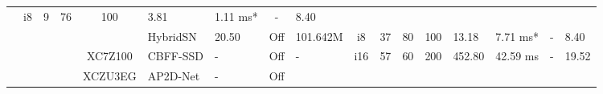 \begin{table}
\begin{adjustbox}{totalheight=\baselineskip,}
\begin{tabular}{ccccclp{2em}cp{3em}cp{2em}p{4em}p{3em}p{3.5em}p{3.5em}p{2.5em}p{3em}}
                                   &\multirow{1}{*}{i8}
                                       &\multirow{1}{*}{9}
                                           &\multirow{1}{*}{76}
                                               &\multirow{1}{*}{100}
                                                   &\multirow{1}{*}{3.81}
                                                       &\multirow{1}{*}{1.11 ms*}
                                                           &\multirow{1}{*}{-}
                                                               &\multirow{1}{*}{8.40}\\
   &   &   &   &   &\multirow{1}{*}{HybridSN}
                       &\multirow{1}{*}{20.50}
                           &\multirow{1}{*}{Off}
                               &\multirow{1}{*}{101.642M}
                                   &\multirow{1}{*}{i8}
                                       &\multirow{1}{*}{37}
                                           &\multirow{1}{*}{80}
                                               &\multirow{1}{*}{100}
                                                   &\multirow{1}{*}{13.18}
                                                       &\multirow{1}{*}{7.71 ms*}
                                                           &\multirow{1}{*}{-}
                                                               &\multirow{1}{*}{8.40}\\
\cmidrule{4-17}
   &   &   &\multirow{1}{*}{\cite{liEfficientObjectDetection2019a}}
               &\multirow{1}{*}{XC7Z100}
                   &\multirow{1}{*}{CBFF-SSD}
                       &\multirow{1}{*}{-}
                           &\multirow{1}{*}{Off}
                               &\multirow{1}{*}{-}
                                   &\multirow{1}{*}{i16}
                                       &\multirow{1}{*}{57}
                                           &\multirow{1}{*}{60}
                                               &\multirow{1}{*}{200}
                                                   &\multirow{1}{*}{452.80}
                                                       &\multirow{1}{*}{42.59 ms}
                                                           &\multirow{1}{*}{-}
                                                               &\multirow{1}{*}{19.52}\\
\cmidrule{4-17}
   &   &   &\multirow{1}{*}{\cite{liNovelCNNBasedAP2DNet2020}}
               &\multirow{1}{*}{XCZU3EG}
                   &\multirow{1}{*}{AP2D-Net}
                       &\multirow{1}{*}{-}
                           &\multirow{1}{*}{Off}

\end{tabular}
\end{adjustbox}
\end{table}
